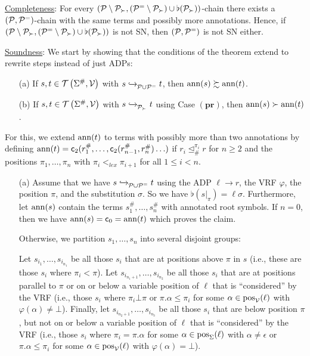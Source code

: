 \RelRPP*

\begin{myproof}
    \underline{Completeness}:
    For every $(\mathcal{P} \setminus \mathcal{P}_{\succ}, (\mathcal{P}^{=} \setminus \mathcal{P}_{\succ}) \cup
        \flat(\mathcal{P}_{\succ}))$-chain there exists a $(\mathcal{P}, \mathcal{P}^{=})$-chain with the same
        terms and possibly
        more annotations.
        Hence, if
$(\mathcal{P} \setminus \mathcal{P}_{\succ}, (\mathcal{P}^{=} \setminus \mathcal{P}_{\succ}) \cup
        \flat(\mathcal{P}_{\succ}))$
 is not SN, then $(\mathcal{P}, \mathcal{P}^{=})$ is not SN either.

    \smallskip

    \noindent
    \underline{Soundness}:
    We start by showing that the conditions of the theorem extend to rewrite steps instead of just ADPs:
    \begin{enumerate}
        \item[(a)] If $s,t \in \mathcal{T}\left(\Sigma^\#,\mathcal{V}\right)$ with $s \mathrel{ \xhookrightarrow{{}_{\scriptstyle }} \!\!{}^{}_{\mathcal{P} \cup \mathcal{P}^{=}} } t$, then $\mathrm{ann}(s) \succsim \mathrm{ann}(t)$.
        \item[(b)] If $s,t \in \mathcal{T}\left(\Sigma^\#,\mathcal{V}\right)$ with $s \mathrel{ \xhookrightarrow{{}_{\scriptstyle }} \!\!{}^{}_{\mathcal{P}_{\succ}} } t$ using Case $(\mathbf{pr})$, then $\mathrm{ann}(s) \succ \mathrm{ann}(t)$.
    \end{enumerate}
    For this, we extend $\mathrm{ann}(t)$ to terms with possibly more than two annotations by defining
    $\mathrm{ann}(t) = \mathsf{c}_{2}(r_1^\#,\ldots,\mathsf{c}_{2}(r_{n-1}^\#,r_n^\#)\ldots)$ 
    if $r_i \trianglelefteq_{\#}^{\pi_i} r$ for $n \geq 2$ and the
    positions $\pi_1, \ldots, \pi_n$ with $\pi_i <_{lex} \pi_{i+1}$ for all $1 \leq i < n$.
   

    \begin{itemize}
        \item[(a)] Assume that we have $s \mathrel{ \xhookrightarrow{{}_{\scriptstyle }} \!\!{}^{}_{\mathcal{P} \cup \mathcal{P}^{=}} } t$ using the
        ADP $\ell \to r$, the VRF $\varphi$, the position $\pi$, and the substitution
        $\sigma$. So we have $\flat(s|_{\pi}) = \ell \sigma$.
        Furthermore, let $\mathrm{ann}(s)$ contain the terms $s_1^\#, \ldots, s_n^\#$
        with annotated root symbols. If $n=0$, then we have $\mathrm{ann}(s) = \mathsf{c}_{0} = \mathrm{ann}(t)$ which
        proves the claim.

        Otherwise, 
        we partition $s_1,\ldots,s_n$ into several disjoint groups:

        Let $s_{i_1}, \ldots, s_{i_{n_1}}$ be all those $s_{i}$ that are at
        positions above $\pi$ in $s$ (i.e., these are those $s_i$ where  $\pi_{i} < \pi$).
        Let $s_{i_{n_1 + 1}}, \ldots, s_{i_{n_2}}$ be all those $s_{i}$
        that are at positions parallel to $\pi$ or on or below a variable position of $\ell$ that
        is ``considered'' by the VRF (i.e., those $s_i$ where
        $\pi_{i} \bot \pi$ or $\pi.\alpha \leq \pi_{i}$ for some $\alpha \in \mathrm{pos}_{\mathcal{V}}(\ell)$ with $\varphi(\alpha) \neq \bot$).
        Finally, let $s_{i_{n_2 + 1}}, \ldots, s_{i_{n_3}}$ be all those $s_{i}$
        that are below position $\pi$, but not on or below a variable position of $\ell$ that
        is ``considered'' by the VRF (i.e., those $s_i$ where
        $\pi_i = \pi.\alpha$ for some $\alpha \in \mathrm{pos}_{\Sigma}(\ell)$ with $\alpha \neq \epsilon$
        or $\pi.\alpha \leq \pi_{i}$ for some $\alpha \in \mathrm{pos}_{\mathcal{V}}(\ell)$ with $\varphi(\alpha) = \bot$).


\end{itemize}
\end{myproof}
